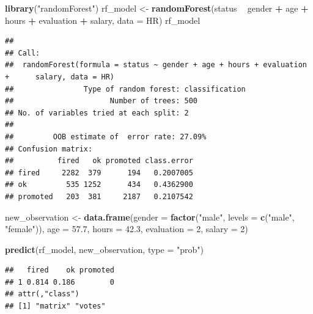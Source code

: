 \documentclass[]{krantz}
\newenvironment{Shaded}{\begin{snugshade}}{\end{snugshade}}
\newcommand{\DataTypeTok}[1]{\textcolor[rgb]{0.13,0.29,0.53}{#1}}
\newcommand{\DecValTok}[1]{\textcolor[rgb]{0.00,0.00,0.81}{#1}}
\newcommand{\FloatTok}[1]{\textcolor[rgb]{0.00,0.00,0.81}{#1}}
\newcommand{\KeywordTok}[1]{\textcolor[rgb]{0.13,0.29,0.53}{\textbf{#1}}}
\newcommand{\NormalTok}[1]{#1}
\newcommand{\OperatorTok}[1]{\textcolor[rgb]{0.81,0.36,0.00}{\textbf{#1}}}
\newcommand{\StringTok}[1]{\textcolor[rgb]{0.31,0.60,0.02}{#1}}
\theoremstyle{definition}
\theoremstyle{definition}
\theoremstyle{definition}
\theoremstyle{remark}
\begin{document}
\begin{Shaded}
\begin{Highlighting}[]
\KeywordTok{library}\NormalTok{(}\StringTok{"randomForest"}\NormalTok{)}
\NormalTok{rf_model <-}\StringTok{ }\KeywordTok{randomForest}\NormalTok{(status }\OperatorTok{~}\StringTok{ }\NormalTok{gender }\OperatorTok{+}\StringTok{ }\NormalTok{age }\OperatorTok{+}\StringTok{ }\NormalTok{hours }\OperatorTok{+}\StringTok{ }\NormalTok{evaluation }\OperatorTok{+}\StringTok{ }\NormalTok{salary, }\DataTypeTok{data =}\NormalTok{ HR)}
\NormalTok{rf_model}
\end{Highlighting}
\end{Shaded}

\begin{verbatim}
## 
## Call:
##  randomForest(formula = status ~ gender + age + hours + evaluation +      salary, data = HR) 
##                Type of random forest: classification
##                      Number of trees: 500
## No. of variables tried at each split: 2
## 
##         OOB estimate of  error rate: 27.09%
## Confusion matrix:
##          fired   ok promoted class.error
## fired     2282  379      194   0.2007005
## ok         535 1252      434   0.4362900
## promoted   203  381     2187   0.2107542
\end{verbatim}

\begin{Shaded}
\begin{Highlighting}[]
\NormalTok{new_observation <-}\StringTok{ }\KeywordTok{data.frame}\NormalTok{(}\DataTypeTok{gender =} \KeywordTok{factor}\NormalTok{(}\StringTok{"male"}\NormalTok{, }\DataTypeTok{levels =} \KeywordTok{c}\NormalTok{(}\StringTok{"male"}\NormalTok{, }\StringTok{"female"}\NormalTok{)),}
                      \DataTypeTok{age =} \FloatTok{57.7}\NormalTok{,}
                      \DataTypeTok{hours =} \FloatTok{42.3}\NormalTok{,}
                      \DataTypeTok{evaluation =} \DecValTok{2}\NormalTok{,}
                      \DataTypeTok{salary =} \DecValTok{2}\NormalTok{)}

\KeywordTok{predict}\NormalTok{(rf_model, new_observation, }\DataTypeTok{type =} \StringTok{"prob"}\NormalTok{)}
\end{Highlighting}
\end{Shaded}

\begin{verbatim}
##   fired    ok promoted
## 1 0.814 0.186        0
## attr(,"class")
## [1] "matrix" "votes"
\end{verbatim}
\end{document}
